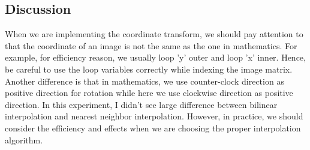 \subsection{Discussion}
When we are implementing the coordinate transform, we should pay attention to that the coordinate of an image is not the same as the one in mathematics. For example, for efficiency reason, we usually loop 'y' outer and loop 'x' inner. Hence, be careful to use the loop variables correctly while indexing the image matrix. Another difference is that in mathematics, we use counter-clock direction as positive direction for rotation while here we use clockwise direction as positive direction.
In this experiment, I didn't see large difference between bilinear interpolation and nearest neighbor interpolation. However, in practice, we should consider the efficiency and effects when we are choosing the proper interpolation algorithm.
























